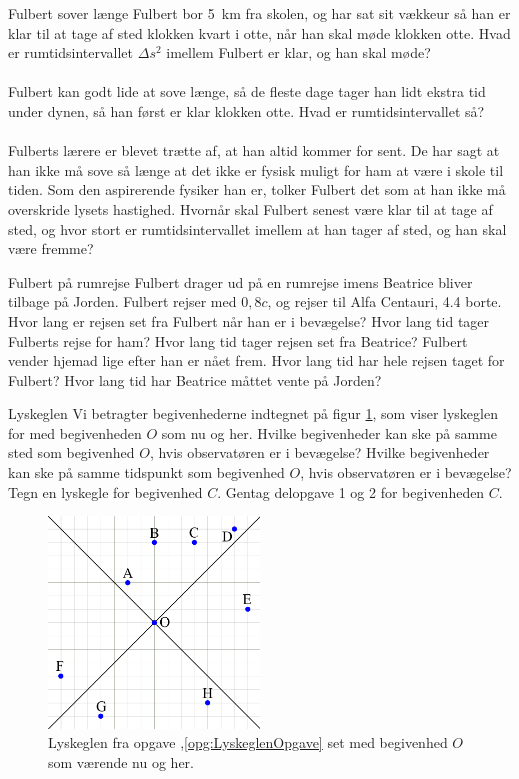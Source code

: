 \begin{opgave}{Fulbert sover længe}%
Fulbert bor \SI{5}{km} fra skolen, og har sat sit vækkeur så han er klar til at tage af sted klokken kvart i otte, når han skal møde klokken otte.
\opg Hvad er rumtidsintervallet $\Delta s^2$ imellem Fulbert er klar, og han skal møde?\\\\
%
Fulbert kan godt lide at sove længe, så de fleste dage tager han lidt ekstra tid under dynen, så han først er klar klokken otte.
\opg Hvad er rumtidsintervallet så?\\\\
%
Fulberts lærere er blevet trætte af, at han altid kommer for sent.
De har sagt at han ikke må sove så længe at det ikke er fysisk muligt for ham at være i skole til tiden.
Som den aspirerende fysiker han er, tolker Fulbert det som at han ikke må overskride lysets hastighed.
\opg Hvornår skal Fulbert senest være klar til at tage af sted, og hvor stort er rumtidsintervallet imellem at han tager af sted, og han skal være fremme?
\end{opgave}

\begin{opgave}{Fulbert på rumrejse}
Fulbert drager ud på en rumrejse imens Beatrice bliver tilbage på Jorden.
Fulbert rejser med $0,8 c$, og rejser til Alfa Centauri, \SI{4,4}{\lightyear} borte.
\opg Hvor lang er rejsen set fra Fulbert når han er i bevægelse?
\opg Hvor lang tid tager Fulberts rejse for ham?
\opg Hvor lang tid tager rejsen set fra Beatrice?
\opg Fulbert vender hjemad lige efter han er nået frem. Hvor lang tid har hele rejsen taget for Fulbert?
\opg Hvor lang tid har Beatrice måttet vente på Jorden?
\end{opgave}


\begin{opgave}{Lyskeglen} \label{opg:LyskeglenOpgave}
Vi betragter begivenhederne indtegnet på figur \ref{fig:LyskegleOpgave}, som viser lyskeglen for med begivenheden $O$ som nu og her.
\opg Hvilke begivenheder kan ske på samme sted som begivenhed $O$, hvis observatøren er i bevægelse?
\opg Hvilke begivenheder kan ske på samme tidspunkt som begivenhed $O$, hvis observatøren er i bevægelse?
\opg Tegn en lyskegle for begivenhed $C$.
\opg Gentag delopgave 1 og 2 for begivenheden $C$.
\end{opgave}

\begin{figure}[h!]
    \centering
    \includegraphics[width=0.5\textwidth]{opg/figurer/SR/Lyskegle.png}
    \caption{Lyskeglen fra opgave \thechapter,\ref{opg:LyskeglenOpgave} set med begivenhed $O$ som værende nu og her.}
    \label{fig:LyskegleOpgave}
\end{figure}